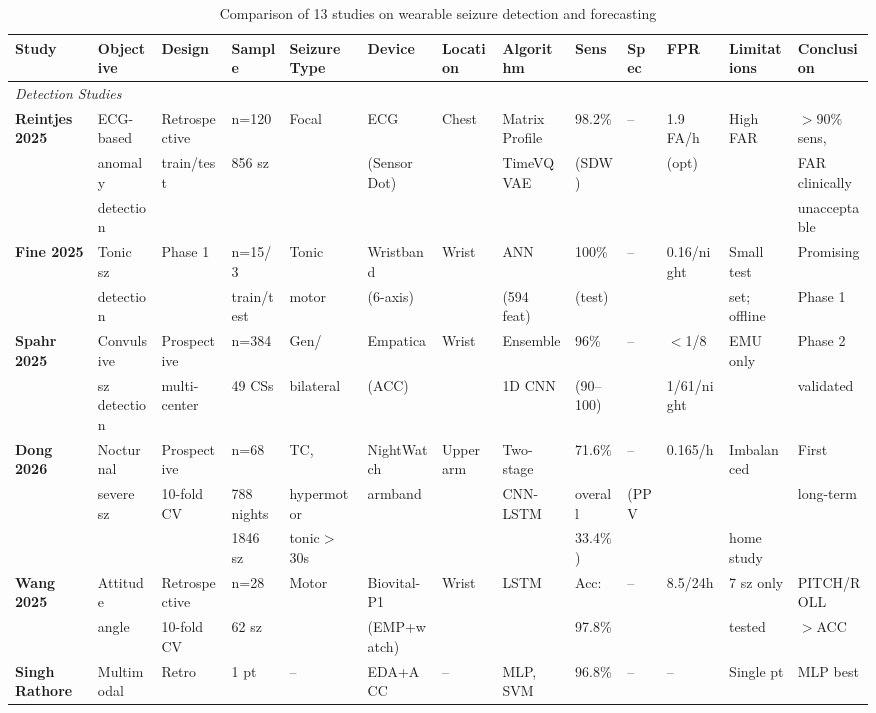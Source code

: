 \begin{table}[htbp]
\centering
\small
\caption{Comparison of 13 studies on wearable seizure detection and forecasting}
\label{tab:comparison}
\begin{tabular}{p{2.8cm}p{1.8cm}p{1.6cm}p{1.4cm}p{1.5cm}p{1.6cm}p{1.4cm}p{1.2cm}p{1.4cm}p{1.4cm}p{1.2cm}p{1.6cm}p{2.2cm}}
\toprule
Study & Objective & Design & Sample & Seizure Type & Device & Location & Algorithm & Sens & Spec & FPR & Limitations & Conclusion \\
\midrule
\multicolumn{13}{l}{\textit{Detection Studies}} \\[4pt]
\textbf{Reintjes 2025} & ECG-based & Retrospective & n=120 & Focal & ECG & Chest & Matrix Profile & 98.2\% & -- & 1.9 FA/h & High FAR & $>$90\% sens, \\
& anomaly & train/test & 856 sz & & (Sensor Dot) & & TimeVQVAE & (SDW) & & (opt) & & FAR clinically \\
& detection & & & & & & & & & & & unacceptable \\[4pt]
\textbf{Fine 2025} & Tonic sz & Phase 1 & n=15/3 & Tonic & Wristband & Wrist & ANN & 100\% & -- & 0.16/night & Small test & Promising \\
& detection & & train/test & motor & (6-axis) & & (594 feat) & (test) & & & set; offline & Phase 1 \\[4pt]
\textbf{Spahr 2025} & Convulsive & Prospective & n=384 & Gen/ & Empatica & Wrist & Ensemble & 96\% & -- & $<$1/8 & EMU only & Phase 2 \\
& sz detection & multi-center & 49 CSs & bilateral & (ACC) & & 1D CNN & (90--100) & & 1/61/night & & validated \\[4pt]
\textbf{Dong 2026} & Nocturnal & Prospective & n=68 & TC, & NightWatch & Upper arm & Two-stage & 71.6\% & -- & 0.165/h & Imbalanced & First \\
& severe sz & 10-fold CV & 788 nights & hypermotor & armband & & CNN-LSTM & overall & (PPV & & & long-term \\
& & & 1846 sz & tonic$>$30s & & & & 33.4\%) & & & home study \\[4pt]
\textbf{Wang 2025} & Attitude & Retrospective & n=28 & Motor & Biovital-P1 & Wrist & LSTM & Acc: & -- & 8.5/24h & 7 sz only & PITCH/ROLL \\
& angle & 10-fold CV & 62 sz & & (EMP+watch) & & & 97.8\% & & & tested & $>$ACC \\[4pt]
\textbf{Singh Rathore} & Multimodal & Retro & 1 pt & -- & EDA+ACC & -- & MLP, SVM & 96.8\% & -- & -- & Single pt & MLP best \\

\end{tabular}
\end{table}
